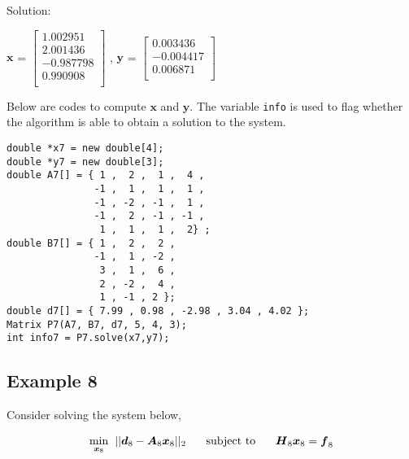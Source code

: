 \documentclass[a4paper]{article}
\begin{document}
Solution:


$\boldsymbol{x}$ = $\begin{bmatrix}
1.002951 \\
2.001436 \\
-0.987798 \\
0.990908 \\
\end{bmatrix}$  
\hspace{0.5cm} , \hspace{0.5cm}  
$\boldsymbol{y}$ = $\begin{bmatrix}
0.003436 \\
-0.004417 \\
0.006871 \\
\end{bmatrix}$ 


Below are codes to compute $\boldsymbol{x}$ and $\boldsymbol{y}$. The variable \texttt{info} is used to flag whether the algorithm is able to obtain a solution to the system.



\begin{verbatim} 
double *x7 = new double[4];
double *y7 = new double[3];
double A7[] = { 1 ,  2 ,  1 ,  4 ,
               -1 ,  1 ,  1 ,  1 , 
               -1 , -2 , -1 ,  1 , 
               -1 ,  2 , -1 , -1 , 
                1 ,  1 ,  1 ,  2} ;
double B7[] = { 1 ,  2 ,  2 ,
               -1 ,  1 , -2 , 
                3 ,  1 ,  6 ,
                2 , -2 ,  4 ,
                1 , -1 , 2 };
double d7[] = { 7.99 , 0.98 , -2.98 , 3.04 , 4.02 };
Matrix P7(A7, B7, d7, 5, 4, 3); 
int info7 = P7.solve(x7,y7); 
\end{verbatim}




\subsection{Example 8}


Consider solving the system below,

\begin{equation*}
\begin{aligned}
\underset{\boldsymbol{x}_{8}}{\min} \hspace{0.2cm} ||\boldsymbol{d}_{8} - \boldsymbol{A}_{8}\boldsymbol{x}_{8} ||_{2}  \hspace{0.5cm} \text{ subject to } \hspace{0.5cm}   \boldsymbol{H}_{8}\boldsymbol{x}_{8} = \boldsymbol{f}_{8}
\end{aligned}
\end{equation*}
\end{document}
